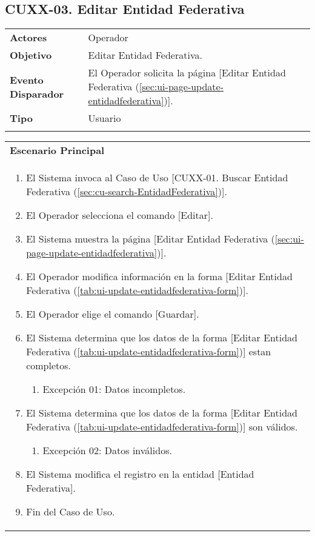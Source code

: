 \clearpage
\subsection{CUXX-03. Editar Entidad Federativa} \label{sec:cu-update-EntidadFederativa}

\begin{tabular}{ p{3.5cm} p{11.5cm} }
	\textbf{Actores} & Operador\\
	\textbf{Objetivo} & Editar Entidad Federativa.\\
	\textbf{Evento Disparador} & El Operador solicita la página [Editar Entidad Federativa (\ref{sec:ui-page-update-entidadfederativa})].\\
	\textbf{Tipo} & Usuario\\
	\\
\end{tabular}

\begin{tabular}{ p{15.5cm} }
	\textbf{Escenario Principal} \\
	\begin{enumerate}
		\item El Sistema invoca al Caso de Uso [CUXX-01. Buscar Entidad Federativa (\ref{sec:cu-search-EntidadFederativa})].
		\item El Operador selecciona el comando [Editar].
		\item El Sistema muestra la página [Editar Entidad Federativa (\ref{sec:ui-page-update-entidadfederativa})].
		\item El Operador modifica información en la forma [Editar Entidad Federativa (\ref{tab:ui-update-entidadfederativa-form})].
		\item El Operador elige el comando [Guardar].
		\item El Sistema determina que los datos de la forma [Editar Entidad Federativa (\ref{tab:ui-update-entidadfederativa-form})] estan completos.
			\begin{enumerate}
				\item Excepción 01: Datos incompletos.
			\end{enumerate}
		\item El Sistema determina que los datos de la forma [Editar Entidad Federativa (\ref{tab:ui-update-entidadfederativa-form})] son válidos.
			\begin{enumerate}
				\item Excepción 02: Datos inválidos.
			\end{enumerate}
		\item El Sistema modifica el registro en la entidad [Entidad Federativa].
		\item Fin del Caso de Uso.
	\end{enumerate}
\end{tabular}

